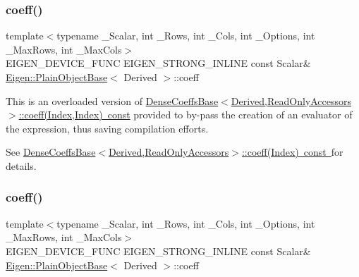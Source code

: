 \subsubsection{\texorpdfstring{coeff()}{coeff()}\hspace{0.1cm}{\footnotesize\ttfamily [1/2]}}
{\footnotesize\ttfamily template$<$typename \+\_\+\+Scalar, int \+\_\+\+Rows, int \+\_\+\+Cols, int \+\_\+\+Options, int \+\_\+\+Max\+Rows, int \+\_\+\+Max\+Cols$>$ \\
E\+I\+G\+E\+N\+\_\+\+D\+E\+V\+I\+C\+E\+\_\+\+F\+U\+NC E\+I\+G\+E\+N\+\_\+\+S\+T\+R\+O\+N\+G\+\_\+\+I\+N\+L\+I\+NE const Scalar\& \mbox{\hyperlink{class_eigen_1_1_plain_object_base}{Eigen\+::\+Plain\+Object\+Base}}$<$ Derived $>$\+::coeff\hspace{0.3cm}{\ttfamily [inline]}}

This is an overloaded version of \mbox{\hyperlink{class_eigen_1_1_dense_coeffs_base_3_01_derived_00_01_read_only_accessors_01_4_ad41647ef695f9a5a58a9a0f50e2ae064}{Dense\+Coeffs\+Base$<$\+Derived,\+Read\+Only\+Accessors$>$\+::coeff(\+Index,\+Index) const}} provided to by-\/pass the creation of an evaluator of the expression, thus saving compilation efforts.

See \mbox{\hyperlink{class_eigen_1_1_dense_coeffs_base_3_01_derived_00_01_read_only_accessors_01_4_ad52344ad1f42852db71996590d2de0de}{Dense\+Coeffs\+Base$<$\+Derived,\+Read\+Only\+Accessors$>$\+::coeff(\+Index) const }}for details. \mbox{\label{class_eigen_1_1_array_af592e3993ea3d4ac9f073b42db2c04cc}} 
\subsubsection{\texorpdfstring{coeff()}{coeff()}\hspace{0.1cm}{\footnotesize\ttfamily [2/2]}}
{\footnotesize\ttfamily template$<$typename \+\_\+\+Scalar, int \+\_\+\+Rows, int \+\_\+\+Cols, int \+\_\+\+Options, int \+\_\+\+Max\+Rows, int \+\_\+\+Max\+Cols$>$ \\
E\+I\+G\+E\+N\+\_\+\+D\+E\+V\+I\+C\+E\+\_\+\+F\+U\+NC E\+I\+G\+E\+N\+\_\+\+S\+T\+R\+O\+N\+G\+\_\+\+I\+N\+L\+I\+NE const Scalar\& \mbox{\hyperlink{class_eigen_1_1_plain_object_base}{Eigen\+::\+Plain\+Object\+Base}}$<$ Derived $>$\+::coeff\hspace{0.3cm}{\ttfamily [inline]}}

